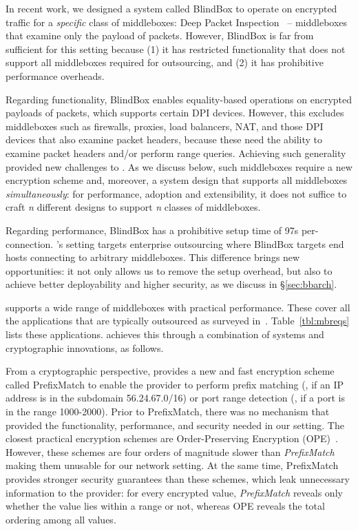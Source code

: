 In recent work, we designed a system called BlindBox to operate on encrypted traffic for a {\em specific} class of middleboxes: Deep Packet Inspection~\cite{blindbox} -- middleboxes that examine only the payload of packets. 
However, BlindBox is far from sufficient for this setting because
 (1) it has restricted functionality that does not support all middleboxes required for outsourcing, and (2) it has prohibitive performance overheads.
 
 Regarding functionality, BlindBox enables equality-based operations on  encrypted payloads of packets, which supports certain DPI devices. However, this excludes middleboxes such as firewalls, proxies, load balancers, NAT,  and those DPI devices that also examine packet headers, because these need the ability to examine packet headers and/or perform range queries. 
 Achieving such generality provided new challenges to \sys. 
As we discuss below, such middleboxes require a new encryption scheme and, moreover, a system design that supports all middleboxes {\it simultaneously}: for performance, adoption and extensibility, it does not suffice to craft {\it n} different designs to support {\it n} classes of middleboxes. 

 
Regarding performance, BlindBox has a prohibitive setup time of 97s per-connection. 
\sys's setting targets enterprise outsourcing where BlindBox targets end hosts connecting to arbitrary middleboxes. This difference brings \sys new opportunities: it
not only allows us to remove the setup overhead, but also to achieve better deployability and higher security, as we discuss in \S\ref{sec:bbarch}. 

\sys supports a wide range of middleboxes with practical performance. These cover all the applications that are typically outsourced as surveyed in~\cite{aplomb}. Table~\ref{tbl:mbreqs} lists these applications. \sys achieves this through a combination of systems and cryptographic innovations, as follows.
   
From a cryptographic perspective, \sys provides a new and fast encryption scheme called PrefixMatch  to enable the provider to perform prefix matching (\eg{}, if an IP address is in the subdomain 56.24.67.0/16) or port range detection (\eg{}, if a port is in the range 1000-2000). Prior to PrefixMatch, there was no mechanism that provided the functionality, performance, and  security needed in our setting. The closest practical encryption schemes are Order-Preserving Encryption (OPE)~\cite{boldyreva:ope,popa:mope,popa:cryptdb}. 
However, these schemes are four orders of magnitude slower than {\it PrefixMatch} making them unusable for our network setting. At the same time, PrefixMatch provides stronger security guarantees than these schemes, which leak unnecessary information to the provider: for every encrypted value, {\em PrefixMatch} reveals only whether the value lies within a range or not, whereas OPE reveals the total ordering among all values.

